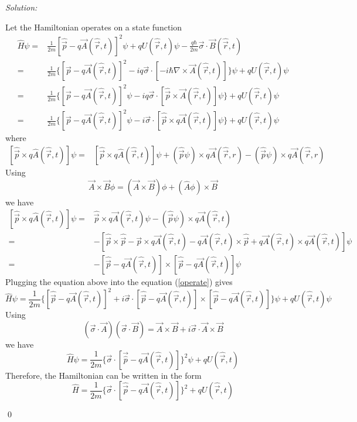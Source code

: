 \documentclass[10pt,a4paper]{article}
\newenvironment{sol}
    {\emph{Solution:}
    }
    {
    \qed
    }
\begin{document}
\begin{sol}
Let the Hamiltonian operates on a state function
\begin{align}
\nonumber\hat{H}\psi=&\frac{1}{2m}[\hat{\vec{p}}-q\vec{A}(\hat{\vec{r}},t)]^2\psi+qU(\hat{\vec{r}},t)\psi-\frac{q\hbar}{2m}\vec{\sigma}\cdot\vec{B}(\hat{\vec{r}},t)\\
\nonumber=&\frac{1}{2m}\{[\vec{p}-q\vec{A}(\hat{\vec{r}},t)]^2-iq\vec{\sigma}\cdot[-i\hbar\nabla\times\vec{A}(\hat{\vec{r}},t)]\}\psi+qU(\hat{\vec{r}},t)\psi\\
\nonumber=&\frac{1}{2m}\{[\vec{p}-q\vec{A}(\hat{\vec{r}},t)]^2\psi-iq\vec{\sigma}\cdot[\hat{\vec{p}}\times\vec{A}(\hat{\vec{r}},t)]\psi\}+qU(\hat{\vec{r}},t)\psi\\
\label{operate}=&\frac{1}{2m}\{[\vec{p}-q\vec{A}(\hat{\vec{r}},t)]^2\psi-i\vec{\sigma}\cdot[\hat{\vec{p}}\times q\vec{A}(\hat{\vec{r}},t)]\psi\}+qU(\hat{\vec{r}},t)\psi
\end{align}
where
\begin{align}
\nonumber[\hat{\vec{p}}\times q\hat{A}(\hat{\vec{r}},t)]\psi=&[\hat{\vec{p}}\times q\hat{A}(\hat{\vec{r}},t)]\psi+(\hat{\vec{p}}\psi)\times q\vec{A}(\hat{\vec{r}},r)-(\hat{\vec{p}}\psi)\times q\vec{A}(\hat{\vec{r}},r)
\end{align}
Using
\begin{equation}
\vec{A}\times\vec{B}\phi=(\vec{A}\times\vec{B})\phi+(\hat{A}\phi)\times\vec{B}
\end{equation}
we have
\begin{align}
\nonumber[\hat{\vec{p}}\times q\hat{A}(\hat{\vec{r}},t)]\psi=&\hat{\vec{p}}\times q\vec{A}(\hat{\vec{r}},t)\psi-(\hat{\vec{p}}\psi)\times q\vec{A}(\hat{\vec{r}},t)\\
\nonumber=&-[\hat{\vec{p}}\times\hat{\vec{p}}-\vec{p}\times q\vec{A}(\hat{\vec{r}},t)-q\vec{A}(\hat{\vec{r}},t)\times\hat{\vec{p}}+q\vec{A}(\hat{\vec{r}},t)\times q\vec{A}(\hat{\vec{r}},t)]\psi\\
=&-[\hat{\vec{p}}-q\vec{A}(\hat{\vec{r}},t)]\times[\hat{\vec{p}}-q\vec{A}(\hat{\vec{r}},t)]\psi
\end{align}
Plugging the equation above into the equation (\ref{operate}) gives
\begin{equation}
\hat{H}\psi=\frac{1}{2m}\{[\hat{\vec{p}}-q\vec{A}(\hat{\vec{r}},t)]^2+i\vec{\sigma}\cdot[\hat{\vec{p}}-q\vec{A}(\hat{\vec{r}},t)]\times[\hat{\vec{p}}-q\vec{A}(\hat{\vec{r}},t)]\}\psi+qU(\hat{\vec{r}},t)\psi
\end{equation}
Using
\begin{equation}
(\vec{\sigma}\cdot\vec{A})(\vec{\sigma}\cdot\vec{B})=\vec{A}\times\vec{B}+i\vec{\sigma}\cdot\vec{A}\times\vec{B}
\end{equation}
we have
\begin{equation}
\hat{H}\psi=\frac{1}{2m}\{\vec{\sigma}\cdot[\vec{\hat{p}}-q\vec{A}(\hat{\vec{r}},t)]\}^2\psi+qU(\hat{\vec{r}},t)
\end{equation}
Therefore, the Hamiltonian can be written in the form
\begin{equation}
\hat{H}=\frac{1}{2m}\{\vec{\sigma}\cdot[\hat{\vec{p}}-q\vec{A}(\hat{\vec{r}},t)]\}^2+qU(\hat{\vec{r}},t)
\end{equation}
\end{sol}
\end{document}
